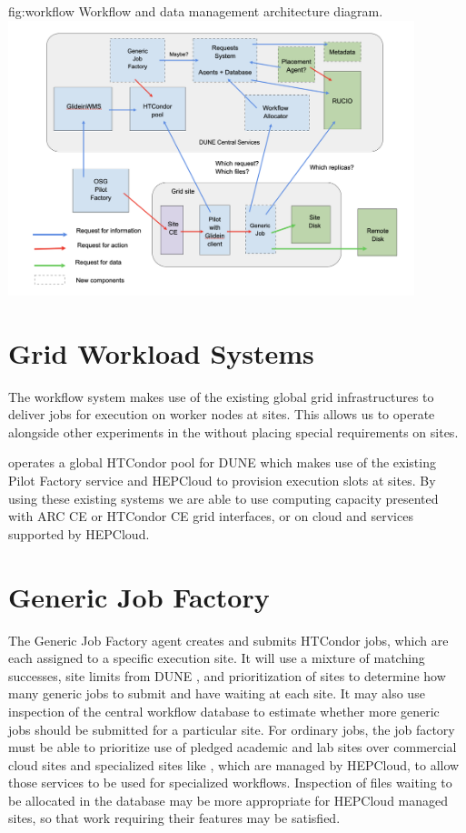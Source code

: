\documentclass[../main-v1.tex]{subfiles}
\begin{document}
\begin{dunefigure}
{fig:workflow} 
{Workflow and data management architecture diagram.}
\includegraphics[height=8cm]{graphics/Workflow/wfs.png}
\end{dunefigure}

\section{Grid Workload Systems}
\label{sec:flow:grid}

The workflow system makes use of the existing global grid infrastructures to deliver jobs for execution on worker nodes at sites. This allows us to operate alongside other experiments in the  without placing special requirements on sites.

 operates a global HTCondor pool for DUNE which makes use of the existing  Pilot Factory service and HEPCloud to provision execution slots at sites. By using these existing systems we are able to use computing capacity presented with ARC CE or HTCondor CE grid interfaces, or on cloud and  services supported by HEPCloud.

\section{Generic Job Factory}
\label{sec:flow:factory}

The Generic Job Factory agent creates and submits HTCondor jobs, which are each assigned to a specific execution site. It will use a mixture of matching successes, site limits from DUNE , and prioritization of sites to determine how many generic jobs to submit and have waiting at each site. It may also use inspection of the central workflow database to estimate whether more generic jobs should be submitted for a particular site. For ordinary jobs, the job factory must be able to prioritize use of pledged academic and lab sites over commercial cloud sites and specialized sites like , which are managed by HEPCloud, to allow those services to be used for specialized workflows. Inspection of files waiting to be allocated in the database may be more appropriate for HEPCloud managed sites, so that work requiring their features may be satisfied.
\end{document}
